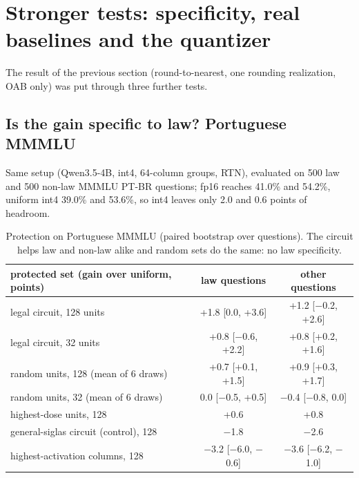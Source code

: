 \documentclass[11pt]{article}
\begin{document}
\section{Stronger tests: specificity, real baselines and the quantizer}
\label{sec:stronger}
The result of the previous section (round-to-nearest, one rounding realization, OAB only) was put through three further tests.

\subsection{Is the gain specific to law? Portuguese MMMLU}
Same setup (Qwen3.5-4B, int4, 64-column groups, RTN), evaluated on 500 law and 500 non-law MMMLU PT-BR questions; fp16 reaches 41.0\% and 54.2\%, uniform int4 39.0\% and 53.6\%, so int4 leaves only 2.0 and 0.6 points of headroom.
\begin{table}[h]
\centering\small
\begin{tabular}{lcc}
\toprule
protected set (gain over uniform, points) & law questions & other questions\\
\midrule
legal circuit, 128 units & +1.8 [0.0, +3.6] & +1.2 [$-$0.2, +2.6]\\
legal circuit, 32 units & +0.8 [$-$0.6, +2.2] & +0.8 [+0.2, +1.6]\\
random units, 128 (mean of 6 draws) & +0.7 [+0.1, +1.5] & +0.9 [+0.3, +1.7]\\
random units, 32 (mean of 6 draws) & 0.0 [$-$0.5, +0.5] & $-$0.4 [$-$0.8, 0.0]\\
highest-dose units, 128 & +0.6 & +0.8\\
general-siglas circuit (control), 128 & $-$1.8 & $-$2.6\\
highest-activation columns, 128 & $-$3.2 [$-$6.0, $-$0.6] & $-$3.6 [$-$6.2, $-$1.0]\\
\bottomrule
\end{tabular}
\caption{Protection on Portuguese MMMLU (paired bootstrap over questions). The circuit helps law and non-law alike and random sets do the same: no law specificity.}
\label{tab:mmmlu}
\end{table}
\end{document}
